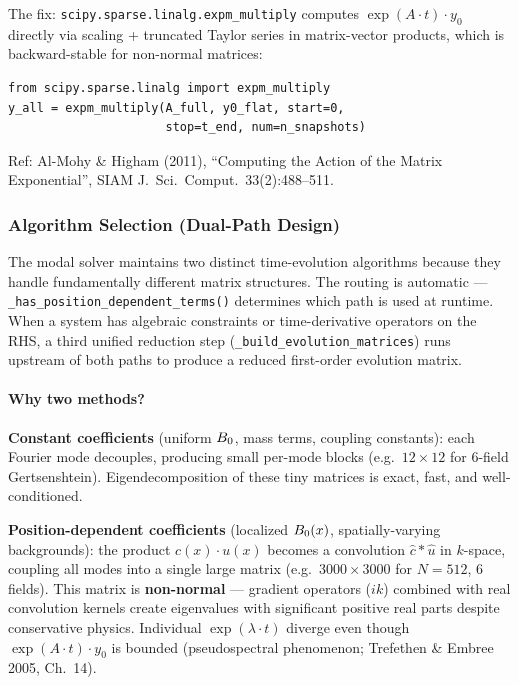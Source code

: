 The fix: \texttt{scipy.sparse.linalg.expm\_multiply} computes $\exp(A \cdot t) \cdot y_0$ directly via scaling + truncated Taylor series in matrix-vector products, which is backward-stable for non-normal matrices:

\begin{lstlisting}[style=python]
from scipy.sparse.linalg import expm_multiply
y_all = expm_multiply(A_full, y0_flat, start=0,
                      stop=t_end, num=n_snapshots)
\end{lstlisting}

Ref: Al-Mohy \& Higham (2011), ``Computing the Action of the Matrix Exponential'', SIAM J.\ Sci.\ Comput.\ 33(2):488--511.

\subsubsection{Algorithm Selection (Dual-Path Design)}
\label{sec:modal-algorithm-selection}

The modal solver maintains two distinct time-evolution algorithms because they handle fundamentally different matrix structures. The routing is automatic --- \texttt{\_has\_position\_dependent\_terms()} determines which path is used at runtime. When a system has algebraic constraints or time-derivative operators on the RHS, a third unified reduction step (\texttt{\_build\_evolution\_matrices}) runs upstream of both paths to produce a reduced first-order evolution matrix.

\paragraph{Why two methods?}
\label{par:modal-why-two}

\textbf{Constant coefficients} (uniform $B_0$, mass terms, coupling constants): each Fourier mode decouples, producing small per-mode blocks (e.g.\ $12\times 12$ for 6-field Gertsenshtein). Eigendecomposition of these tiny matrices is exact, fast, and well-conditioned.

\textbf{Position-dependent coefficients} (localized $B_0(x)$, spatially-varying backgrounds): the product $c(x) \cdot u(x)$ becomes a convolution $\hat{c} * \hat{u}$ in $k$-space, coupling all modes into a single large matrix (e.g.\ $3000\times 3000$ for $N=512$, 6 fields). This matrix is \textbf{non-normal} --- gradient operators ($ik$) combined with real convolution kernels create eigenvalues with significant positive real parts despite conservative physics. Individual $\exp(\lambda \cdot t)$ diverge even though $\exp(A \cdot t) \cdot y_0$ is bounded (pseudospectral phenomenon; Trefethen \& Embree 2005, Ch.\ 14).

